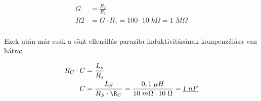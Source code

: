 \begin{equation}
\begin{aligned}{}
    G &= \frac{R_2}{R_1} \\
    R2 &= G \cdot R_1 = 100 \cdot 10\;k\Omega = \underline{1\;M\Omega} \\
\end{aligned}
\end{equation}

Ezek után már csak a sönt ellenállás parazita induktivitásának kompenzálása van hátra:


\begin{equation}
\begin{aligned}{}
    R_C \cdot C &= \frac{L_s}{R_s} \\
    C &= \frac{L_S}{R_S \cdot \R_C} = \frac{0,1\;\mu{H}}{10\;m\Omega \cdot 10\;\Omega} = \underline{1\;nF} \\
\end{aligned}
\end{equation}